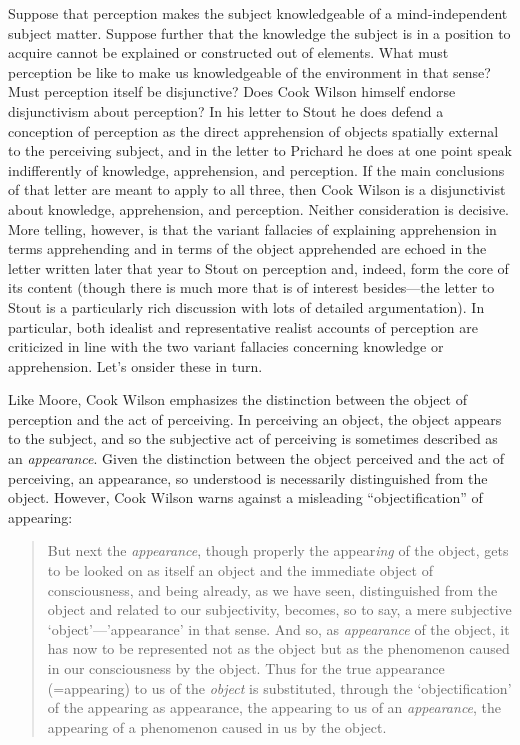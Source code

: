 Suppose that perception makes the subject knowledgeable of a mind-independent subject matter. Suppose further that the knowledge the subject is in a position to acquire cannot be explained or constructed out of elements. What must perception be like to make us knowledgeable of the environment in that sense? Must perception itself be disjunctive? Does Cook Wilson himself endorse disjunctivism about perception? In his letter to Stout he does defend a conception of perception as the direct apprehension of objects spatially external to the perceiving subject, and in the letter to Prichard he does at one point speak indifferently of knowledge, apprehension, and perception. If the main conclusions of that letter are meant to apply to all three, then Cook Wilson is a disjunctivist about knowledge, apprehension, and perception. Neither consideration is decisive. More telling, however, is that the variant fallacies of explaining apprehension in terms apprehending and in terms of the object apprehended are echoed in the letter written later that year to Stout on perception and, indeed, form the core of its content (though there is much more that is of interest besides---the letter to Stout is a particularly rich discussion with lots of detailed argumentation). In particular, both idealist and representative realist accounts of perception are criticized in line with the two variant fallacies concerning knowledge or apprehension. Let's onsider these in turn.

Like Moore, Cook Wilson emphasizes the distinction between the object of perception and the act of perceiving. In perceiving an object, the object appears to the subject, and so the subjective act of perceiving is sometimes described as an \emph{appearance}. Given the distinction between the object perceived and the act of perceiving, an appearance, so understood is necessarily distinguished from the object. However, Cook Wilson warns against a misleading ``objectification'' of appearing:
\begin{quote}
	But next the \emph{appearance}, though properly the appear\emph{ing} of the object, gets to be looked on as itself an object and the immediate object of consciousness, and being already, as we have seen, distinguished from the object and related to our subjectivity, becomes, so to say, a mere subjective `object'---'appearance' in that sense. And so, as \emph{appearance} of the object, it has now to be represented not as the object but as the phenomenon caused in our consciousness by the object. Thus for the true appearance (=appearing) to us of the \emph{object} is substituted, through the `objectification' of the appearing as appearance, the appearing to us of an \emph{appearance}, the appearing of a phenomenon caused in us by the object.  \citep[796]{Cook-Wilson:1926sf}
\end{quote}

